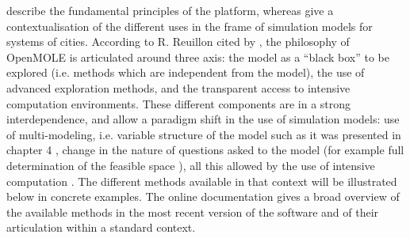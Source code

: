 \documentclass[10pt]{article}
\begin{document}
\cite{reuillon2013openmole} describe the fundamental principles of the platform, whereas \cite{pumain2017urban} give a contextualisation of the different uses in the frame of simulation models for systems of cities. According to R. Reuillon cited by \cite{raimbault2017applied}, the philosophy of OpenMOLE is articulated around three axis: the model as a ``black box'' to be explored (i.e. methods which are independent from the model), the use of advanced exploration methods, and the transparent access to intensive computation environments. These different components are in a strong interdependence, and allow a paradigm shift in the use of simulation models: use of multi-modeling, i.e. variable structure of the model such as it was presented in chapter 4 \citep{cottineau2015modular}, change in the nature of questions asked to the model (for example full determination of the feasible space \citep{10.1371/journal.pone.0138212}), all this allowed by the use of intensive computation \citep{schmitt2015half}. The different methods available in that context will be illustrated below in concrete examples. The online documentation gives a broad overview of the available methods in the most recent version of the software and of their articulation within a standard context.
\end{document}
